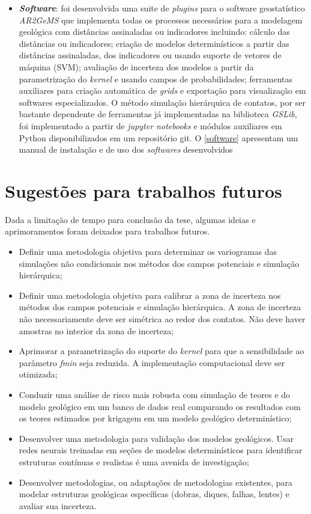 \begin{itemize}
    \item \textbf{\textit{Software}}: foi desenvolvida uma suite de \textit{plugins} para o software geostatístico \textit{AR2GeMS} que implementa todas os processos necessários para a modelagem geológica com distâncias assinaladas ou indicadores incluindo: cálculo das distâncias ou indicadores; criação de modelos determinísticos a partir das distâncias assinaladas, dos indicadores ou usando suporte de vetores de máquina (SVM); avaliação de incerteza dos modelos a partir da parametrização do \textit{kernel} e usando campos de probabilidades; ferramentas auxiliares para criação automática de \textit{grids} e exportação para visualização em softwares especializados. O método simulação hierárquica de contatos, por ser bastante dependente de ferramentas já implementadas na biblioteca \textit{GSLib}, foi implementado a partir de \textit{jupyter notebooks} e módulos auxiliares em Python disponibilizados em um repositório git. O \autoref{software} apresentam um manual de instalação e de uso dos \textit{softwares} desenvolvidos
    \end{itemize}

\section{Sugestões para trabalhos futuros}

Dada a limitação de tempo para conclusão da tese, algumas ideias e aprimoramentos foram deixados para trabalhos futuros. 

 \begin{itemize}
    \item Definir uma metodologia objetiva para determinar os variogramas das simulações não condicionais nos métodos dos campos potenciais e simulação hierárquica; 
    \item Definir uma metodologia objetiva para calibrar a zona de incerteza nos métodos dos campos potenciais e simulação hierárquica. A zona de incerteza não necessariamente deve ser simétrica ao redor dos contatos. Não deve haver amostras no interior da zona de incerteza;
    \item Aprimorar a parametrização do suporte do \textit{kernel} para que a sensibilidade ao parâmetro \textit{fmin} seja reduzida. A implementação computacional deve ser otimizada;
    \item Conduzir uma análise de risco mais robusta com simulação de teores e do modelo geológico em um banco de dados real comparando os resultados com os teores estimados por krigagem em um modelo geológico determinístico; 
    \item Desenvolver uma metodologia para validação dos modelos geológicos. Usar redes neurais treinadas em seções de modelos determinísticos para identificar estruturas contínuas e realistas é uma avenida de investigação;
    \item Desenvolver metodologias, ou adaptações de metodologias existentes, para modelar estruturas geológicas específicas (dobras, diques, falhas, lentes) e avaliar sua incerteza.
 \end{itemize}